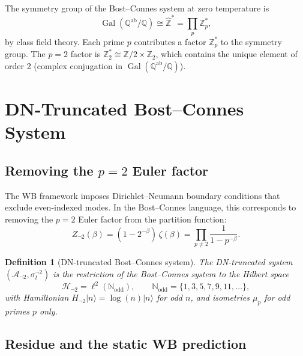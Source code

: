 \documentclass[12pt,a4paper]{article}
\newtheorem{definition}[theorem]{Definition}
\newcommand{\Gal}{\operatorname{Gal}}
\newcommand{\Zhat}{\hat{\mathbb{Z}}}
\newcommand{\Qab}{\mathbb{Q}^{\mathrm{ab}}}
\begin{document}
The symmetry group of the Bost--Connes system at zero temperature is
\begin{equation}
  \Gal(\Qab/\mathbb{Q}) \cong \Zhat^* = \prod_p \mathbb{Z}_p^*,
\end{equation}
by class field theory. Each prime $p$ contributes a factor $\mathbb{Z}_p^*$ to the symmetry group. The $p=2$ factor is $\mathbb{Z}_2^* \cong \mathbb{Z}/2 \times \mathbb{Z}_2$, which contains the unique element of order 2 (complex conjugation in $\Gal(\Qab/\mathbb{Q})$).

\section{DN-Truncated Bost--Connes System}
\label{sec:DN-BC}

\subsection{Removing the $p=2$ Euler factor}

The WB framework imposes Dirichlet--Neumann boundary conditions that exclude even-indexed modes. In the Bost--Connes language, this corresponds to removing the $p=2$ Euler factor from the partition function:
\begin{equation}\label{eq:DN-partition}
  Z_{\neg 2}(\beta) = (1 - 2^{-\beta})\,\zeta(\beta) = \prod_{p \neq 2}\frac{1}{1-p^{-\beta}}.
\end{equation}

\begin{definition}[DN-truncated Bost--Connes system]
The DN-truncated system $(\mathcal{A}_{\neg 2}, \sigma_t^{\neg 2})$ is the restriction of the Bost--Connes system to the Hilbert space
\begin{equation}
  \mathcal{H}_{\neg 2} = \ell^2(\mathbb{N}_{\mathrm{odd}}), \qquad \mathbb{N}_{\mathrm{odd}} = \{1, 3, 5, 7, 9, 11, \ldots\},
\end{equation}
with Hamiltonian $H_{\neg 2}|n\rangle = \log(n)|n\rangle$ for odd $n$, and isometries $\mu_p$ for odd primes $p$ only.
\end{definition}

\subsection{Residue and the static WB prediction}
\end{document}
